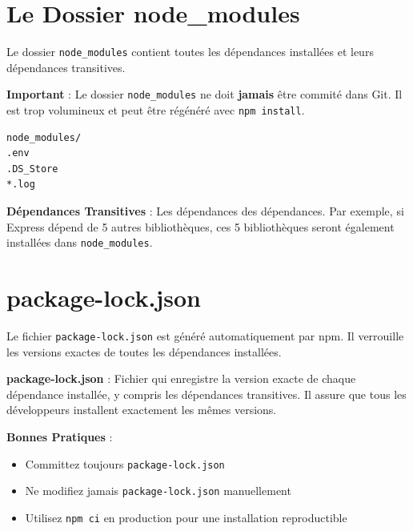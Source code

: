 \section{Le Dossier node\_modules}

Le dossier \texttt{node\_modules} contient toutes les dépendances installées et leurs dépendances transitives.

\begin{warningbox}
    \textbf{Important} : Le dossier \texttt{node\_modules} ne doit \textbf{jamais} être commité dans Git. Il est trop volumineux et peut être régénéré avec \texttt{npm install}.
\end{warningbox}

\begin{lstlisting}[style=bash, caption=Contenu de .gitignore]
node_modules/
.env
.DS_Store
*.log
\end{lstlisting}

\begin{definitionbox}
    \textbf{Dépendances Transitives} : Les dépendances des dépendances. Par exemple, si Express dépend de 5 autres bibliothèques, ces 5 bibliothèques seront également installées dans \texttt{node\_modules}.
\end{definitionbox}

\section{package-lock.json}

Le fichier \texttt{package-lock.json} est généré automatiquement par npm. Il verrouille les versions exactes de toutes les dépendances installées.

\begin{definitionbox}
    \textbf{package-lock.json} : Fichier qui enregistre la version exacte de chaque dépendance installée, y compris les dépendances transitives. Il assure que tous les développeurs installent exactement les mêmes versions.
\end{definitionbox}

\begin{bestpracticebox}
    \textbf{Bonnes Pratiques} :
    \begin{itemize}
        \item Committez toujours \texttt{package-lock.json}
        \item Ne modifiez jamais \texttt{package-lock.json} manuellement
        \item Utilisez \texttt{npm ci} en production pour une installation reproductible
    \end{itemize}
\end{bestpracticebox}


